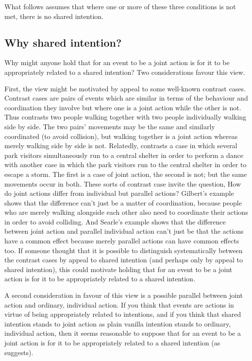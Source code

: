 \documentclass[12pt,\papersize]{extarticle}
\begin{document}
What follows assumes that where one or more of these three conditions is not met, there is no shared intention. 


\subsection{Why shared intention?}
Why might anyone hold that for an event to be a joint action is for it to be appropriately related to a shared intention?
Two considerations favour this view.

First, the view might be motivated by appeal to some well-known contrast cases.
Contrast cases are pairs of events which are similar in terms of the behaviour and coordination they involve but where one is a joint action while the other is not.  
Thus \citet{gilbert_walking_1990} contrasts two people walking together with two people individually walking side by side.  
The two pairs' movements may be the same and similarly coordinated (to avoid collision), but walking together is a joint action whereas merely walking side by side is not. 
Relatedly,  \citet{Searle:1990em}  contrasts a case in which several park visitors simultaneously run to a central shelter in order to perform a dance with another case in which the park visitors run to the central shelter in order to escape a storm.  The first is a case of joint action, the second is not; but the same movements occur in both.  
These sorts of contrast case invite the question, 
How do joint actions differ from individual but parallel actions? 
Gilbert’s example shows that the difference can’t just be a matter of coordination, because people who are merely walking alongside each other also need to coordinate their actions in order to avoid colliding.  
And Searle’s example shows that the difference between joint action and parallel individual action can’t just be that the actions have a common effect because merely parallel actions can have common effects too. 
If someone thought that it is possible to distinguish systematically between the contrast cases by appeal to shared intention (and perhaps only by appeal to shared intention), this could motivate holding that for an event to be a joint action is for it to be appropriately related to a shared intention.

{\label{text:second_consideration} A second consideration} in favour of this view is a possible parallel between joint action and ordinary, individual action.
If you think that events are actions in virtue of being appropriately related to intentions, 
and if you think that shared intention stands to joint action as plain vanilla intention stands to ordinary, individual action,
then it seems reasonable to suppose that for an event to be a joint action is for it to be appropriately related to a shared intention (as \citealp{Pacherie:2012fk} suggests).
\end{document}
